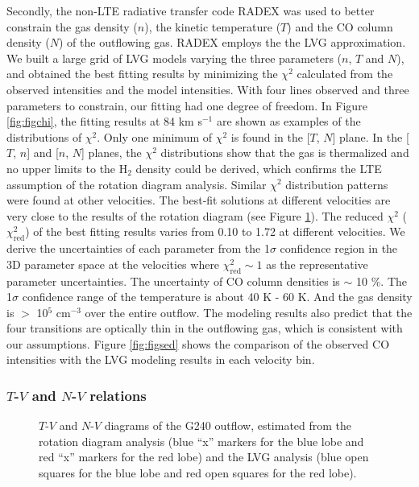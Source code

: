 Secondly, the non-LTE radiative transfer code RADEX \citep{2007A&A...468..627V} was used to better constrain the gas density ($n$), the kinetic temperature ($T$) and the CO column density ($N$) of the outflowing gas. RADEX employs the the LVG approximation. We built a large grid of LVG models varying the three parameters ($n$, $T$ and $N$), and obtained the best fitting results by minimizing the $\chi^2$ calculated from the observed intensities and the model intensities. With four lines observed and three parameters to constrain, our fitting had one degree of freedom. In Figure \ref{fig:figchi}, the fitting results at 84 km s$^{-1}$ are shown as examples of the distributions of $\chi^2$. Only one minimum of $\chi^2$ is found in the [$T$, $N$] plane. In the [$T$, $n$] and [$n$, $N$] planes, the $\chi^2$ distributions show that the gas is thermalized and no upper limits to the H$_2$ density could be derived, which confirms the LTE assumption of the rotation diagram analysis. Similar $\chi^2$ distribution patterns were found at other velocities. The best-fit solutions at different velocities are very close to the results of the rotation diagram (see Figure \ref{fig:figrelation}). The reduced $\chi^2$ ($\chi^2_{\mathrm{red}}$) of the best fitting results varies from 0.10 to 1.72 at different velocities. We derive the uncertainties of each parameter from the 1$\sigma$ confidence region in the 3D parameter space at the velocities where $\chi^2_{\mathrm{red}} \sim 1$ as the representative parameter uncertainties. The uncertainty of CO column densities is $\sim$ 10 \%. The 1$\sigma$ confidence range of the temperature is about 40 K - 60 K. And the gas density is $>$ 10$^5$ cm$^{-3}$ over the entire outflow. The modeling results also predict that the four transitions are optically thin in the outflowing gas, which is consistent with our assumptions. Figure \ref{fig:figsed} shows the comparison of the observed CO intensities with the LVG modeling results in each velocity bin. 

\subsubsection{$T$-$V$ and $N$-$V$ relations}

\begin{figure}[!tbp]
\caption{$T$-$V$ and $N$-$V$ diagrams of the G240 outflow, estimated from the rotation diagram analysis (blue ``x'' markers for the blue lobe and red ``x'' markers for the red lobe) and the LVG analysis (blue open squares for the blue lobe and red open squares for the red lobe). \label{fig:figrelation}}
\end{figure}

